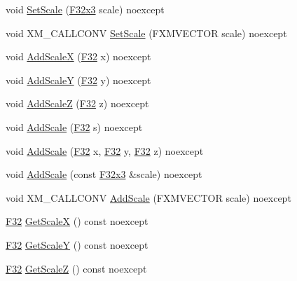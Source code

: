 \begin{DoxyCompactItemize}
\item 
void \hyperlink{classmage_1_1_local_transform_a8e489c87ad55a7a39a5ec72cc878700b}{Set\+Scale} (\hyperlink{namespacemage_a73fbe0da4b8d5bc156bb8453e5b63a17}{F32x3} scale) noexcept
\item 
void X\+M\+\_\+\+C\+A\+L\+L\+C\+O\+NV \hyperlink{classmage_1_1_local_transform_a2f8086f72f3c72a641db1b59e8b3e9c0}{Set\+Scale} (F\+X\+M\+V\+E\+C\+T\+OR scale) noexcept
\item 
void \hyperlink{classmage_1_1_local_transform_a5b3bdbe95a1b531271a122d1fe26f0a6}{Add\+ScaleX} (\hyperlink{namespacemage_aa97e833b45f06d60a0a9c4fc22ae02c0}{F32} x) noexcept
\item 
void \hyperlink{classmage_1_1_local_transform_abd8826a904947b5934ba6afef3b3826f}{Add\+ScaleY} (\hyperlink{namespacemage_aa97e833b45f06d60a0a9c4fc22ae02c0}{F32} y) noexcept
\item 
void \hyperlink{classmage_1_1_local_transform_a28160bebf308eec45d9649a197d91336}{Add\+ScaleZ} (\hyperlink{namespacemage_aa97e833b45f06d60a0a9c4fc22ae02c0}{F32} z) noexcept
\item 
void \hyperlink{classmage_1_1_local_transform_a7c7c84c097157d87bcd3c1d58fc6f8df}{Add\+Scale} (\hyperlink{namespacemage_aa97e833b45f06d60a0a9c4fc22ae02c0}{F32} s) noexcept
\item 
void \hyperlink{classmage_1_1_local_transform_a8de03038d4455846983ccf5b7a0cb08d}{Add\+Scale} (\hyperlink{namespacemage_aa97e833b45f06d60a0a9c4fc22ae02c0}{F32} x, \hyperlink{namespacemage_aa97e833b45f06d60a0a9c4fc22ae02c0}{F32} y, \hyperlink{namespacemage_aa97e833b45f06d60a0a9c4fc22ae02c0}{F32} z) noexcept
\item 
void \hyperlink{classmage_1_1_local_transform_a3bf03266ca3266cd1eecab3b3dd73e77}{Add\+Scale} (const \hyperlink{namespacemage_a73fbe0da4b8d5bc156bb8453e5b63a17}{F32x3} \&scale) noexcept
\item 
void X\+M\+\_\+\+C\+A\+L\+L\+C\+O\+NV \hyperlink{classmage_1_1_local_transform_a1c2ae4604dfd52b8a58356eb78ac99bf}{Add\+Scale} (F\+X\+M\+V\+E\+C\+T\+OR scale) noexcept
\item 
\hyperlink{namespacemage_aa97e833b45f06d60a0a9c4fc22ae02c0}{F32} \hyperlink{classmage_1_1_local_transform_ad539c04b897276a35bd3f25ad2163371}{Get\+ScaleX} () const noexcept
\item 
\hyperlink{namespacemage_aa97e833b45f06d60a0a9c4fc22ae02c0}{F32} \hyperlink{classmage_1_1_local_transform_a8c15528f78365b5dc853d1e9035b4cc4}{Get\+ScaleY} () const noexcept
\item 
\hyperlink{namespacemage_aa97e833b45f06d60a0a9c4fc22ae02c0}{F32} \hyperlink{classmage_1_1_local_transform_a79225f12e49fce5d16653ad2671a7e97}{Get\+ScaleZ} () const noexcept

\end{DoxyCompactItemize}
